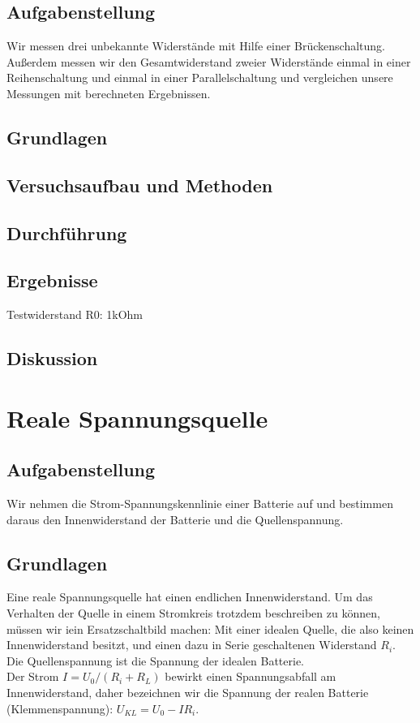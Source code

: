 \documentclass{article}
\begin{document}
\subsection{Aufgabenstellung}
Wir messen drei unbekannte Widerstände mit Hilfe einer Brückenschaltung.
Außerdem messen wir den Gesamtwiderstand zweier Widerstände einmal in einer Reihenschaltung und einmal in einer Parallelschaltung und vergleichen unsere Messungen mit berechneten Ergebnissen.
\subsection{Grundlagen}
\subsection{Versuchsaufbau und Methoden}
\subsection{Durchführung}
\subsection{Ergebnisse}
Testwiderstand R0: 1kOhm
\subsection{Diskussion}

\section{Reale Spannungsquelle}

\subsection{Aufgabenstellung}
Wir nehmen die Strom-Spannungskennlinie einer Batterie auf und bestimmen daraus den Innenwiderstand der Batterie und die Quellenspannung.


\subsection{Grundlagen}
Eine reale Spannungsquelle hat einen endlichen Innenwiderstand. Um das Verhalten der Quelle in einem Stromkreis trotzdem beschreiben zu können, müssen wir iein Ersatzschaltbild machen: Mit einer idealen Quelle, die also keinen Innenwiderstand besitzt, und einen dazu in Serie geschaltenen Widerstand $R_i$.\\
Die Quellenspannung ist die Spannung der idealen Batterie.\\
Der Strom $I=U_0/(R_i+R_L)$ bewirkt einen Spannungsabfall am Innenwiderstand, daher bezeichnen wir die Spannung der realen Batterie (Klemmenspannung): $U_{KL}=U_0-IR_i$.
\end{document}
